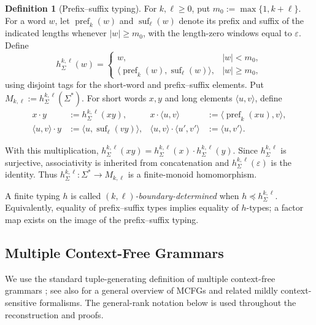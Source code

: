 \documentclass[11pt]{article}
\numberwithin{equation}{section}
\theoremstyle{plain}
\theoremstyle{definition}
\newtheorem{definition}[theorem]{Definition}
\theoremstyle{remark}
\newcommand{\eps}{\varepsilon}
\begin{document}
\begin{definition}[Prefix--suffix typing]
\label{def:prefix-suffix-typing}
For $k,\ell\ge0$, put $m_0:=\max\{1,k+\ell\}$.  For a word $w$, let
$\operatorname{pref}_k(w)$ and $\operatorname{suf}_\ell(w)$ denote its prefix
and suffix of the indicated lengths whenever $|w|\ge m_0$, with the length-zero
windows equal to $\eps$.  Define
\[
 h_\Sigma^{k,\ell}(w)=
 \begin{cases}
   w, & |w|<m_0,\\
   \langle\operatorname{pref}_k(w),\operatorname{suf}_\ell(w)\rangle,
      & |w|\ge m_0,
 \end{cases}
\]
using disjoint tags for the short-word and prefix--suffix elements.  Put
$M_{k,\ell}:=h_\Sigma^{k,\ell}(\Sigma^*)$.  For short words $x,y$ and long
elements $\langle u,v\rangle$, define
\[
\begin{aligned}
 x\cdot y&:=h_\Sigma^{k,\ell}(xy), &
 x\cdot\langle u,v\rangle&:=\langle\operatorname{pref}_k(xu),v\rangle,\\
 \langle u,v\rangle\cdot y&:=\langle u,\operatorname{suf}_\ell(vy)\rangle, &
 \langle u,v\rangle\cdot\langle u',v'\rangle&:=\langle u,v'\rangle.
\end{aligned}
\]
\end{definition}

With this multiplication,
$h_\Sigma^{k,\ell}(xy)=h_\Sigma^{k,\ell}(x)\cdot h_\Sigma^{k,\ell}(y)$.
Since $h_\Sigma^{k,\ell}$ is surjective, associativity is inherited from
concatenation and $h_\Sigma^{k,\ell}(\eps)$ is the identity.  Thus
$h_\Sigma^{k,\ell}:\Sigma^*\to M_{k,\ell}$ is a finite-monoid homomorphism.

A finite typing $h$ is called \emph{$(k,\ell)$-boundary-determined} when
$h\preceq h_\Sigma^{k,\ell}$.  Equivalently, equality of prefix--suffix types implies equality of $h$-types;
a factor map exists on the image of the prefix--suffix typing.


\subsection{Multiple Context-Free Grammars}

We use the standard tuple-generating definition of multiple context-free
grammars \cite{SekiEtAl1991}; see also \cite{Kallmeyer2010} for a general
overview of MCFGs and related mildly context-sensitive formalisms.
The general-rank notation below is used throughout the reconstruction and proofs.
\end{document}
